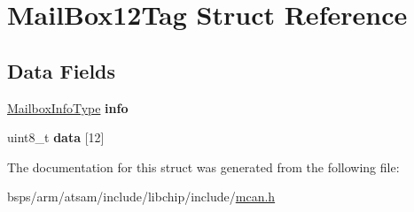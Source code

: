 \hypertarget{structMailBox12Tag}{}\section{Mail\+Box12\+Tag Struct Reference}
\label{structMailBox12Tag}
\subsection*{Data Fields}
\begin{DoxyCompactItemize}
\item 
\mbox{\label{structMailBox12Tag_a382cae53dfa46820edfe36638c12fbf1}} 
\mbox{\hyperlink{structMailboxInfoTag}{Mailbox\+Info\+Type}} {\bfseries info}
\item 
\mbox{\label{structMailBox12Tag_a44df5f458353b6d1b00a164d22b8971b}} 
uint8\+\_\+t {\bfseries data} \mbox{[}12\mbox{]}
\end{DoxyCompactItemize}


The documentation for this struct was generated from the following file\+:\begin{DoxyCompactItemize}
\item 
bsps/arm/atsam/include/libchip/include/\mbox{\hyperlink{mcan_8h}{mcan.\+h}}\end{DoxyCompactItemize}
